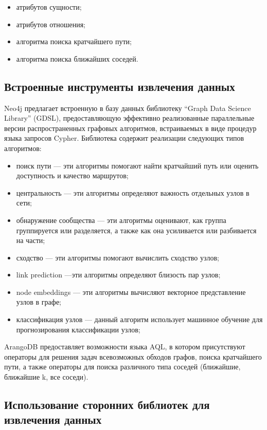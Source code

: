 \begin{itemize}
    \item атрибутов сущности;
    \item атрибутов отношения;
    \item алгоритма поиска кратчайшего пути;
    \item алгоритма поиска ближайших соседей.
\end{itemize}

\subsection{Встроенные инструменты извлечения данных}

Neo4j предлагает встроенную в базу данных библиотеку “Graph Data Science Library” (GDSL), предоставляющую эффективно реализованные параллельные версии распространенных графовых алгоритмов, встраиваемых в виде процедур языка запросов Cypher. Библиотека содержит реализации следующих типов алгоритмов:

\begin{itemize}
    \item поиск пути — эти алгоритмы помогают найти кратчайший путь или оценить доступность и качество маршрутов;
    \item центральность — эти алгоритмы определяют важность отдельных узлов в сети;
    \item обнаружение сообщества — эти алгоритмы оценивают, как группа группируется или разделяется, а также как она усиливается или разбивается на части;
    \item сходство — эти алгоритмы помогают вычислить сходство узлов;
    \item link prediction —эти алгоритмы определяют близость пар узлов;
    \item node embeddings — эти алгоритмы вычисляют векторное представление узлов в графе;
    \item классификация узлов — данный алгоритм использует машинное обучение для прогнозирования классификации узлов;
\end{itemize}

ArangoDB предоставляет возможности языка AQL, в котором присутствуют операторы для решения задач всевозможных обходов графов, поиска кратчайшего пути, а также операторы для поиска различного типа соседей (ближайшие, ближайшие k, все соседи).

\subsection{Использование сторонних библиотек для извлечения данных}

